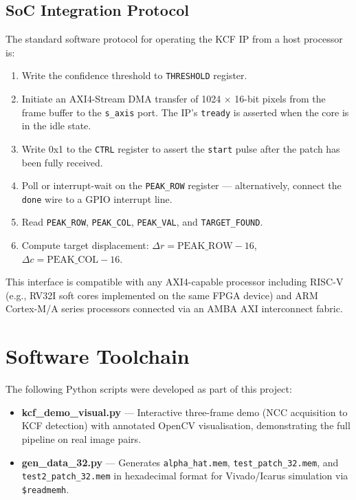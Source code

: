 \documentclass[a4paper,12pt]{report}
\begin{document}
\subsection{SoC Integration Protocol}

The standard software protocol for operating the KCF IP from a host processor is:

\begin{enumerate}
    \item Write the confidence threshold to \texttt{THRESHOLD} register.
    \item Initiate an AXI4-Stream DMA transfer of 1024 $\times$ 16-bit pixels from the frame buffer to the \texttt{s\_axis} port. The IP's \texttt{tready} is asserted when the core is in the idle state.
    \item Write 0x1 to the \texttt{CTRL} register to assert the \texttt{start} pulse after the patch has been fully received.
    \item Poll or interrupt-wait on the \texttt{PEAK\_ROW} register — alternatively, connect the \texttt{done} wire to a GPIO interrupt line.
    \item Read \texttt{PEAK\_ROW}, \texttt{PEAK\_COL}, \texttt{PEAK\_VAL}, and \texttt{TARGET\_FOUND}.
    \item Compute target displacement: $\Delta r = \text{PEAK\_ROW} - 16$, $\Delta c = \text{PEAK\_COL} - 16$.
\end{enumerate}

\par This interface is compatible with any AXI4-capable processor including RISC-V (e.g., RV32I soft cores implemented on the same FPGA device) and ARM Cortex-M/A series processors connected via an AMBA AXI interconnect fabric.

\section{Software Toolchain}

The following Python scripts were developed as part of this project:

\begin{itemize}
    \item \textbf{kcf\_demo\_visual.py} --- Interactive three-frame demo (NCC acquisition to KCF detection) with annotated OpenCV visualisation, demonstrating the full pipeline on real image pairs.
    \item \textbf{gen\_data\_32.py} --- Generates \texttt{alpha\_hat.mem}, \texttt{test\_patch\_32.mem}, and \texttt{test2\allowbreak\_patch\_32.mem} in hexadecimal format for Vivado/Icarus simulation via \texttt{\$readmemh}.
\end{itemize}
\end{document}
